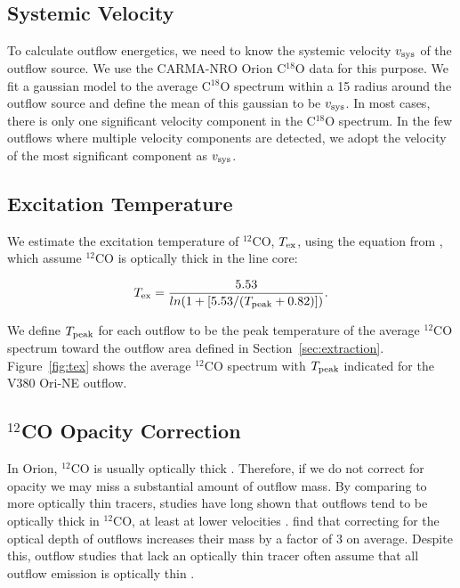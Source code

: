 \documentclass[twocolumn]{aastex62}
\newcommand{\example}{V380 Ori-NE}
\newcommand{\tex}{$T_{\rm ex}$}
\newcommand{\co}[1][]{\ensuremath{^{#1}}CO}
\begin{document}
\subsection{Systemic Velocity}\label{sec:vsys}
To calculate outflow energetics, we need to know the systemic velocity $v_{\rm sys}$ of the outflow source. We use the CARMA-NRO Orion C$^{18}$O data \citep{Kong18} for this purpose. We fit a gaussian model to the average C$^{18}$O spectrum within a 15\arcsec{} radius around the outflow source and define the mean of this gaussian to be $v_{\rm sys}$. In most cases, there is only one significant velocity component in the C$^{18}$O spectrum. In the few outflows where multiple velocity components are detected, we adopt the velocity of the most significant component as $v_{\rm sys}$.

\subsection{Excitation Temperature}\label{sec:tex}
We estimate the excitation temperature of $^{12}$CO, \tex, using the equation from \citet{Rohlfs96}, which assume $^{12}$CO is optically thick in the line core:

\begin{equation}\label{eq:Tex}
T_{\rm ex} = \frac{5.53}{ln(1 + [5.53/(T_{\rm peak} + 0.82)])}.
\end{equation}

We define $T_{\rm peak}$ for each outflow to be the peak temperature of the average $^{12}$CO spectrum toward the outflow area defined in Section~\ref{sec:extraction}. Figure~\ref{fig:tex} shows the average $^{12}$CO spectrum with $T_{\rm peak}$ indicated for the \example{} outflow.


\subsection{$^{12}$CO Opacity Correction}\label{sec:opacity}
In Orion, \co[12]{} is usually optically thick \citep{Kong18}. Therefore, if we do not correct for opacity we may miss a substantial amount of outflow mass. By comparing to more optically thin tracers, studies have long shown that outflows tend to be optically thick in \co[12]{}, at least at lower velocities \citep[e.g.,][]{Goldsmith84,Arce01}. \citet{Dunham14} find that correcting for the optical depth of outflows increases their mass by a factor of 3 on average. Despite this, outflow studies that lack an optically thin tracer often assume that all outflow emission is optically thin \citep[e.g. in Orion,][]{Morgan91,Takahashi08}. 
\end{document}
